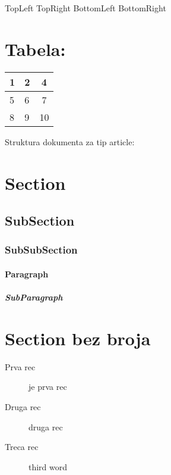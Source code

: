 \documentclass{article}
\begin{document}
TopLeft \hfill TopRight
\vfill
BottomLeft \hfill BottomRight

\section{Tabela:}
\begin{tabular} {|l|l|c|} %
\hline
		1 & 2 & 4 \\
		\hline
		5 & 6 & 7 \\
		\hline 
		8 & 9 & 10 \\
		\hline
\end{tabular}

Struktura dokumenta za tip article:
\section{Section}
\subsection{SubSection}
\subsubsection{SubSubSection}
\paragraph{Paragraph}
\subparagraph{SubParagraph}

\section*{Section bez broja}

\begin{description}
	\item[Prva rec] je prva rec
	\item[Druga rec] druga rec
	\item[Treca rec] third word
\end{description}
\end{document}
